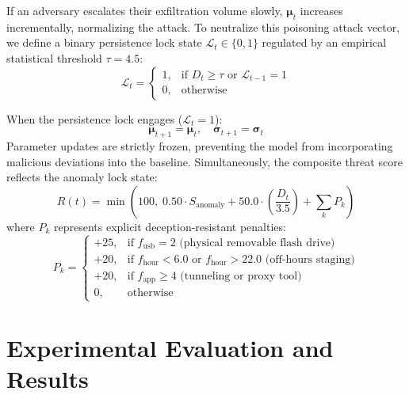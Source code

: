 \documentclass[conference]{IEEEtran}
\begin{document}
If an adversary escalates their exfiltration volume slowly, $\boldsymbol{\mu}_t$ increases incrementally, normalizing the attack. To neutralize this poisoning attack vector, we define a binary persistence lock state $\mathcal{L}_t \in \{0, 1\}$ regulated by an empirical statistical threshold $\tau = 4.5$:
\begin{equation}
\mathcal{L}_t = \begin{cases}
1, & \text{if } D_t \ge \tau \text{ or } \mathcal{L}_{t-1} = 1 \\
0, & \text{otherwise}
\end{cases}
\end{equation}

When the persistence lock engages ($\mathcal{L}_t = 1$):
\begin{equation}
\boldsymbol{\mu}_{t+1} = \boldsymbol{\mu}_t, \quad \boldsymbol{\sigma}_{t+1} = \boldsymbol{\sigma}_t
\end{equation}
Parameter updates are strictly frozen, preventing the model from incorporating malicious deviations into the baseline. Simultaneously, the composite threat score reflects the anomaly lock state:
\begin{equation}
R(t) = \min\left(100, \; 0.50 \cdot S_{\text{anomaly}} + 50.0 \cdot \left(\frac{D_t}{3.5}\right) + \sum_{k} P_k\right)
\end{equation}
where $P_k$ represents explicit deception-resistant penalties:
\begin{equation}
P_k = \begin{cases}
+25, & \text{if } f_{\text{usb}} = 2 \text{ (physical removable flash drive)} \\
+20, & \text{if } f_{\text{hour}} < 6.0 \text{ or } f_{\text{hour}} > 22.0 \text{ (off-hours staging)} \\
+20, & \text{if } f_{\text{app}} \ge 4 \text{ (tunneling or proxy tool)} \\
0, & \text{otherwise}
\end{cases}
\end{equation}

\section{Experimental Evaluation and Results}
\end{document}
